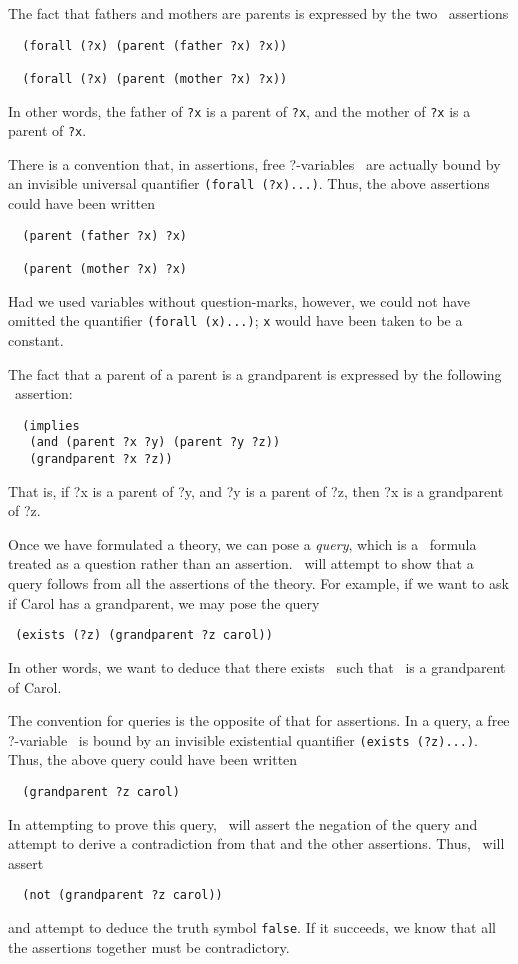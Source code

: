 The fact that fathers and mothers are parents is expressed by the two \snark\
assertions
\begin{verbatim}
  (forall (?x) (parent (father ?x) ?x))

  (forall (?x) (parent (mother ?x) ?x))
\end{verbatim}
In other words, the father of {\tt ?x} is a parent of {\tt ?x}, and the
mother of {\tt ?x} is a parent of {\tt ?x}.

There is a convention that, in assertions, free ?-variables \varx\  are actually
bound by an invisible universal quantifier \verb'(forall (?x)...)'.  Thus, the
above assertions could have been written
\begin{verbatim}
  (parent (father ?x) ?x)

  (parent (mother ?x) ?x)
\end{verbatim}
Had we used variables without question-marks, however, we could not have
omitted the quantifier \verb'(forall (x)...)'; \verb'x' would have been taken to
be a constant.

The fact that a parent of a parent is a grandparent is expressed by
the following \snark\  assertion:
\begin{verbatim}
  (implies
   (and (parent ?x ?y) (parent ?y ?z))
   (grandparent ?x ?z))
\end{verbatim}
That is, if ?x is a parent of ?y, and ?y is a parent of ?z, then ?x is
a grandparent of ?z.

Once we have formulated a theory, we can pose a {\em query}, which is a
\snark\  formula treated as a question rather than an assertion.
\Snark\  will attempt to show that a query follows from all the assertions of
the theory.
For example, if we want to ask if Carol has a grandparent, we may pose the
query
\begin{verbatim}
 (exists (?z) (grandparent ?z carol))
\end{verbatim}
In other words, we want to deduce that there exists \varz\  such that \varz\
is a grandparent of Carol.

The convention for queries is the opposite of that for assertions.  In a
query, a free ?-variable \varz\  is bound by an invisible existential quantifier
\verb'(exists (?z)...)'.  Thus, the above query could have been written
\begin{verbatim}
  (grandparent ?z carol)
\end{verbatim}

In attempting to prove this query, \snark\  will assert the negation of the
query and attempt to derive a contradiction from that and the other
assertions.  Thus, \snark\  will assert
\begin{verbatim}
  (not (grandparent ?z carol))
\end{verbatim}
and attempt to deduce the truth symbol \verb'false'.  If it succeeds, we know
that all the assertions together must be contradictory.


